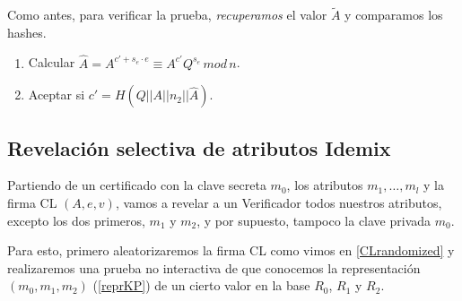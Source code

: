 \hfil

Como antes, para verificar la prueba, \textit{recuperamos} el valor $\tilde{A}$ y comparamos los hashes.

\begin{algorithm}[Verificar $P_2 := (c', s_e)(n_2)$]
	\hfil
	
	\begin{enumerate}
		\item Calcular $\hat{A} = A^{c'+s_e\cdot e} \equiv A^{c'}Q^{s_e} \, mod \, n$.
		\item Aceptar si $c' = H(Q||A||n_2||\hat{A})$.
	\end{enumerate}
	
\end{algorithm}



\subsection{Revelación selectiva de atributos Idemix}

Partiendo de un certificado con la clave secreta $m_0$, los atributos $m_1,\dots,m_l$ y la firma CL $(A,e,v)$, vamos a revelar a un Verificador todos nuestros atributos, excepto los dos primeros, $m_1$ y $m_2$, y por supuesto, tampoco la clave privada $m_0$.

Para esto, primero aleatorizaremos la firma CL como vimos en \ref{CLrandomized} y realizaremos una prueba no interactiva de que conocemos la representación $(m_0,m_1,m_2)$ (\ref{reprKP}) de un cierto valor en la base $R_0$, $R_1$ y $R_2$.


